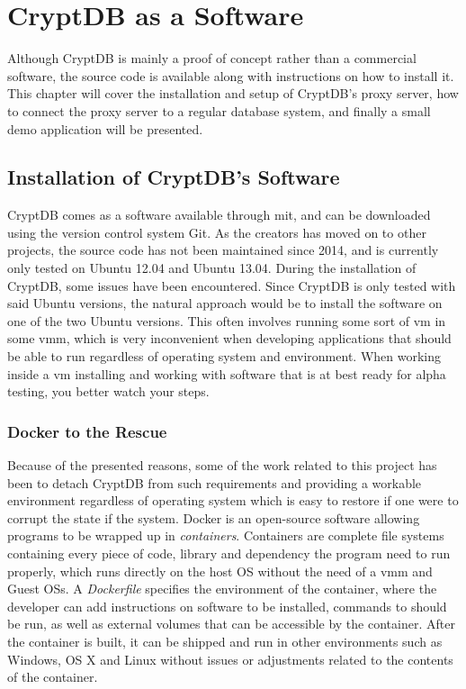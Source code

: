 \chapter{CryptDB as a Software}
\label{chp:software}

Although CryptDB is mainly a proof of concept rather than a commercial software, the source code is available along with instructions on how to install it. This chapter will cover the installation and setup of CryptDB's proxy server, how to connect the proxy server to a regular database system, and finally a small demo application will be presented.

\section{Installation of CryptDB's Software}

CryptDB comes as a software available through \gls{mit}, and can be downloaded using the version control system Git. As the creators has moved on to other projects, the source code has not been maintained since 2014, and is currently only tested on Ubuntu 12.04 and Ubuntu 13.04. During the installation of CryptDB, some issues have been encountered. Since CryptDB is only tested with said Ubuntu versions, the natural approach would be to install the software on one of the two Ubuntu versions. This often involves running some sort of \gls{vm} in some \gls{vmm}, which is very inconvenient when developing applications that should be able to run regardless of operating system and environment. When working inside a \gls{vm} installing and working with software that is at best ready for alpha testing, you better watch your steps. 

\subsection{Docker to the Rescue}


Because of the presented reasons, some of the work related to this project has been to detach CryptDB from such requirements and providing a workable environment regardless of operating system which is easy to restore if one were to corrupt the state if the system. Docker \cite{docker_homepage} is an open-source software allowing programs to be wrapped up in \emph{containers}. Containers are complete file systems containing every piece of code, 
library and dependency the program need to run properly, which runs directly on the host OS without the need of a \gls{vmm} and Guest OSs. A \emph{Dockerfile} specifies the environment of the container, where the developer can add instructions on software to be installed, commands to should be run, as well as external volumes that can be accessible by the container. After the container is built, it can be shipped and run in other environments such as Windows, OS X and Linux without issues or adjustments related to the contents of the container.

